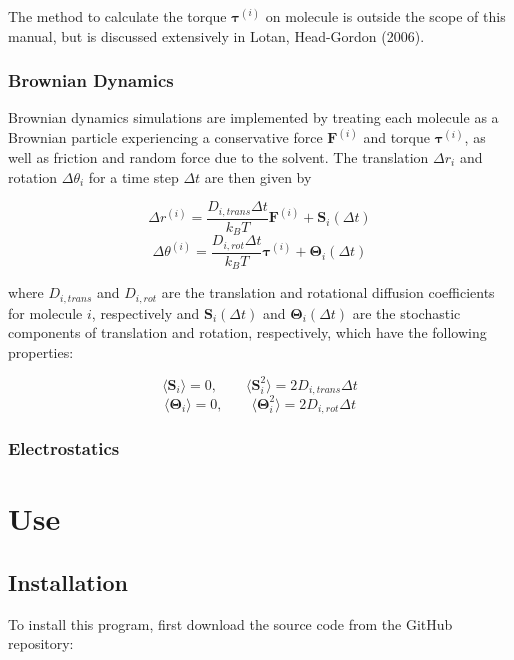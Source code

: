 The method to calculate the torque $\boldsymbol{\tau}^{(i)}$ on molecule is outside the scope of this manual, but is discussed extensively in Lotan, Head-Gordon (2006).

\subsection{Brownian Dynamics}

Brownian dynamics simulations are implemented by treating each molecule as a Brownian particle experiencing a conservative force $\textbf{F}^{(i)}$ and torque $\boldsymbol{\tau}^{(i)}$, as well as friction and random force due to the solvent. The translation $\Delta r_i$ and rotation $\Delta \theta_i$ for a time step $\Delta t$ are then given by

\[\Delta r^{(i)} = \frac{D_{i, trans} \Delta t}{k_B T} \textbf{F}^{(i)} + \textbf{S}_i(\Delta t)\]
\[\Delta \theta^{(i)} = \frac{D_{i, rot} \Delta t}{k_B T} \boldsymbol{\tau}^{(i)} + \boldsymbol{\Theta}_i(\Delta t)\]

where $D_{i, trans}$ and $D_{i, rot}$ are the translation and rotational diffusion coefficients for molecule $i$, respectively and $\textbf{S}_i(\Delta t)$ and $\boldsymbol{\Theta}_i(\Delta t)$ are the stochastic components of translation and rotation, respectively, which have the following properties:

\[\langle \textbf{S}_i \rangle=0, \qquad \langle \textbf{S}_i^2 \rangle=2D_{i, trans}\Delta t\]
\[\langle \boldsymbol{\Theta}_i \rangle=0, \qquad \langle \boldsymbol{\Theta}_i^2 \rangle=2D_{i, rot}\Delta t\]

\subsection{Electrostatics}

\clearpage


\chapter{Use}

\section{Installation}

To install this program, first download the source code from the GitHub repository: \\

